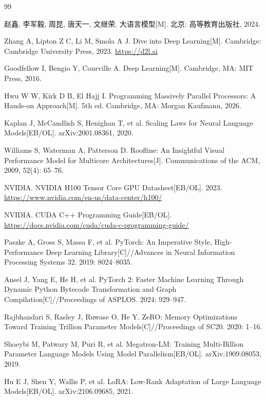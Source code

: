 \begin{thebibliography}{99}
\small

 赵鑫, 李军毅, 周昆, 唐天一, 文继荣. 大语言模型[M]. 北京: 高等教育出版社, 2024.

 Zhang A, Lipton Z C, Li M, Smola A J. Dive into Deep Learning[M]. Cambridge: Cambridge University Press, 2023. \url{https://d2l.ai}

 Goodfellow I, Bengio Y, Courville A. Deep Learning[M]. Cambridge, MA: MIT Press, 2016.

 Hwu W W, Kirk D B, El Hajj I. Programming Massively Parallel Processors: A Hands-on Approach[M]. 5th ed. Cambridge, MA: Morgan Kaufmann, 2026.

 Kaplan J, McCandlish S, Henighan T, et al. Scaling Laws for Neural Language Models[EB/OL]. arXiv:2001.08361, 2020.

 Williams S, Waterman A, Patterson D. Roofline: An Insightful Visual Performance Model for Multicore Architectures[J]. Communications of the ACM, 2009, 52(4): 65--76.

 NVIDIA. NVIDIA H100 Tensor Core GPU Datasheet[EB/OL]. 2023. \url{https://www.nvidia.com/en-us/data-center/h100/}

 NVIDIA. CUDA C++ Programming Guide[EB/OL]. \url{https://docs.nvidia.com/cuda/cuda-c-programming-guide/}

 Paszke A, Gross S, Massa F, et al. PyTorch: An Imperative Style, High-Performance Deep Learning Library[C]//Advances in Neural Information Processing Systems 32. 2019: 8024--8035.

 Ansel J, Yang E, He H, et al. PyTorch 2: Faster Machine Learning Through Dynamic Python Bytecode Transformation and Graph Compilation[C]//Proceedings of ASPLOS. 2024: 929--947.

 Rajbhandari S, Rasley J, Ruwase O, He Y. ZeRO: Memory Optimizations Toward Training Trillion Parameter Models[C]//Proceedings of SC20. 2020: 1--16.

 Shoeybi M, Patwary M, Puri R, et al. Megatron-LM: Training Multi-Billion Parameter Language Models Using Model Parallelism[EB/OL]. arXiv:1909.08053, 2019.

 Hu E J, Shen Y, Wallis P, et al. LoRA: Low-Rank Adaptation of Large Language Models[EB/OL]. arXiv:2106.09685, 2021.


\end{thebibliography}
